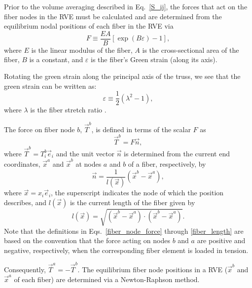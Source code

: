 Prior to the volume averaging described in Eq.\ \eqref{S_ij}, the forces that act on the fiber nodes in the RVE must be calculated and are determined from the equilibrium nodal positions of each fiber in the RVE via 
%
\begin{equation}
F \equiv \frac{E A}{B}[\exp(B \varepsilon) - 1],
\label{fiber_force}
\end{equation}
%
where $E$ is the linear modulus of the fiber, $A$ is the cross-sectional area of the fiber, $B$ is a constant, and $\varepsilon$ is the fiber's Green strain (along its axis).

Rotating the green strain along the principal axis of the truss, we see that the green strain can be written as:
%
\begin{equation}
\varepsilon \equiv \frac{1}{2} \left(\lambda^2-1\right),
\label{Green_strain}
\end{equation}
% 
where $\lambda$ is the fiber stretch ratio \cite{Chandran:2007hy}. 

The force on fiber node $b$, $\vec{T}^b$, is defined in terms of the scalar $F$ as
%
\begin{equation}
\vec{T}^b = F \vec{n},
\label{fiber_node_force}
\end{equation}
%
where $\vec{T}^b = T^b_i \vec{e}_i$ and the unit vector $\vec{n}$ is determined from the current end coordinates, $\vec{x}^a$ and $\vec{x}^b$ at nodes $a$ and $b$ of a fiber, respectively, by
%
\begin{equation}
\vec{n} = \frac{1}{l(\vec{x})}(\vec{x}^b - \vec{x}^a),
\end{equation}
%
where $\vec{x} = x_i \vec{e}_i$, the superscript indicates the node of which the position describes, and $l(\vec{x})$ is the current length of the fiber given by
%
\begin{equation}
l(\vec{x}) = \sqrt{(\vec{x}^b - \vec{x}^a) \cdot (\vec{x}^b - \vec{x}^a)}.
\label{fiber_length}
\end{equation}
%
Note that the definitions in Eqs.\ \eqref{fiber_node_force} through \eqref{fiber_length} are based on the convention that the force acting on nodes $b$ and $a$ are positive and negative, respectively, when the corresponding fiber element is loaded in tension.

Consequently, $\vec{T}^a = - \vec{T}^b$. The equilibrium fiber node positions in a RVE ($\vec{x}^b$ and $\vec{x}^a$ of each fiber) are determined via a Newton-Raphson method.

